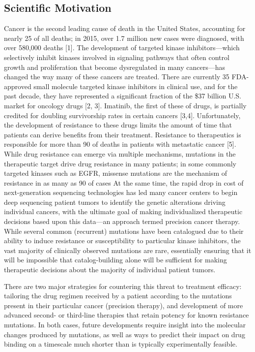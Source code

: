 \documentclass[conference]{IEEEtran}
\begin{document}

\subsection{Scientific Motivation}\label{sec:motivation}

Cancer is the second leading cause of death in the United States, accounting for nearly 25 of all deaths; in 2015, over 1.7 million new cases were diagnosed, with over 580,000 deaths [1]. The development of targeted kinase inhibitors—which selectively inhibit kinases involved in signaling pathways that often control growth and proliferation that become dysregulated in many cancers—has changed the way many of these cancers are treated. There are currently 35 FDA-approved small molecule targeted kinase inhibitors in clinical use, and for the past decade, they have represented a significant fraction of the \$37 billion U.S. market for oncology drugs [2, 3]. Imatinib, the first of these of drugs, is partially credited for doubling survivorship rates in certain cancers [3,4]. Unfortunately, the development of resistance to these drugs limits the amount of time that patients can derive benefits from their treatment. Resistance to therapeutics is responsible for more than 90 of deaths in patients with metastatic cancer [5]. While drug resistance can emerge via multiple mechanisms, mutations in the therapeutic target drive drug resistance in many patients; in some commonly targeted kinases such as EGFR, missense mutations are the mechanism of resistance in as many as 90 of cases           
At the same time, the rapid drop in cost of next-generation sequencing technologies has led many cancer centers to begin deep sequencing patient tumors to identify the genetic alterations driving individual cancers, with the ultimate goal of making individualized therapeutic decisions based upon this data—an approach termed precision cancer therapy. While several common (recurrent) mutations have been catalogued due to their ability to induce resistance or susceptibility to particular kinase inhibitors, the vast majority of clinically observed mutations are rare, essentially ensuring that it will be impossible that catalog-building alone will be sufficient for making therapeutic decisions about the majority of individual patient tumors.

There are two major strategies for countering this threat to treatment efficacy: tailoring the drug regimen received by a patient according to the mutations present in their particular cancer (precision therapy), and development of more advanced second- or third-line therapies that retain potency for known resistance mutations. In both cases, future developments require insight into the molecular changes produced by mutations, as well as ways to predict their impact on drug binding on a timescale much shorter than is typically experimentally feasible. 
\end{document}
